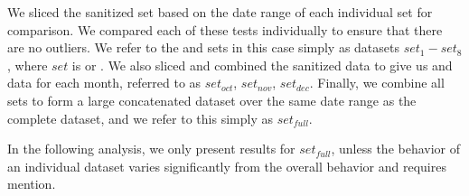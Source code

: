 We sliced the sanitized \test set based on the date range of each 
individual \control set for comparison. We compared each of these tests 
individually to ensure that there are no outliers. We refer to the \test and 
\control sets in this case simply as datasets $set_1 - set_8$, where $set$ is 
\test or \control. We also sliced and combined the sanitized data to give us 
\control and \test data for each month, referred to as $set_{oct}$, $set_{nov}$, 
$set_{dec}$. Finally, we combine all \control sets to form a large concatenated 
dataset over the same date range as the complete \test dataset, and we refer to 
this simply as $set_{full}$. 

In the following analysis, we only present results for $set_{full}$, unless the 
behavior of an individual dataset varies significantly from the overall behavior 
and requires mention.



